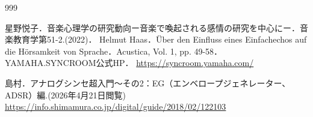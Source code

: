 \documentclass[uplatex,dvipdfmx]{jlreq}
\begin{document}
\begin{thebibliography}{999}

星野悦子．音楽心理学の研究動向ー音楽で喚起される感情の研究を中心にー．音楽教育学第51-2.(2022)．
Helmut Haas．Über den Einfluss eines Einfachechos auf die Hörsamkeit von Sprache．Acustica, Vol. 1, pp. 49-58．
YAMAHA.SYNCROOM公式HP．
\small\url{https://syncroom.yamaha.com/}

島村．アナログシンセ超入門～その2：EG（エンベロープジェネレーター、ADSR）編.(2026年4月21日閲覧)
\small\url{https://info.shimamura.co.jp/digital/guide/2018/02/122103}

\end{thebibliography}
\end{document}
